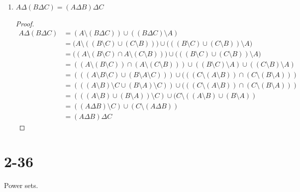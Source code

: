 \documentclass{article}
\begin{document}
\begin{enumerate}
    \item[d)] $A \Delta (B \Delta C) = (A \Delta B) \Delta C$
        \begin{proof}
            \begin{align*}
                A \Delta (B \Delta C) &= (A \setminus (B \Delta C)) \cup ((B \Delta C) \setminus A) \\
                &= \Big(A \setminus ((B \setminus C) \cup (C \setminus B))\Big) \cup \Big(((B \setminus C) \cup (C \setminus B)) \setminus A\Big) \\
                &= \Big((A \setminus (B \setminus C) \cap A \setminus (C \setminus B))\Big) \cup \Big(((B \setminus C) \cup (C \setminus B)) \setminus A\Big) \\
                &= ((A \setminus (B \setminus C)) \cap (A \setminus (C \setminus B))) \cup ((B \setminus C)\setminus A) \cup ((C \setminus B)\setminus A) \\
                &= (((A \setminus B \setminus C) \cup (B \setminus A \setminus C))) \cup (((C \setminus (A \setminus B)) \cap (C \setminus (B \setminus A))) \\
                &= (((A \setminus B) \setminus C \cup (B \setminus A) \setminus C)) \cup (((C \setminus (A \setminus B)) \cap (C \setminus (B \setminus A))) \\
                &= (((A \setminus B) \cup (B \setminus A)) \setminus C) \cup (C \setminus ((A \setminus B) \cup (B \setminus A)) \\
                &= ((A \Delta B) \setminus C) \cup (C \setminus (A \Delta B)) \\
                &= (A \Delta B) \Delta C 
            \end{align*}
        \end{proof}
\end{enumerate}

\section{2-36}

Power sets.
\end{document}

